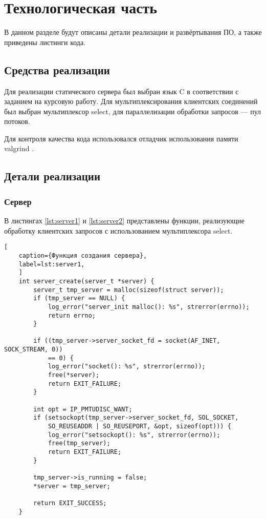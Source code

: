 \chapter{Технологическая часть}

В данном разделе будут описаны детали реализации и развёртывания ПО, а также приведены листинги кода.

\section{Средства реализации}

Для реализации статического сервера был выбран язык C в соответствии с заданием на курсовую работу. Для мультиплексирования клиентских соединений был выбран мультиплексор select, для параллелизации обработки запросов --- пул потоков.

Для контроля качества кода использовался отладчик использования памяти valgrind \cite{valgrind}.

\section{Детали реализации}

\subsection{Сервер}

В листингах \ref{lst:server1} и \ref{lst:server2} представлены функции, реализующие обработку клиентских запросов с использованием мультиплексора select.

\begin{lstlisting}[
	caption={Функция создания сервера},
	label=lst:server1,
	]
	int server_create(server_t *server) {
		server_t tmp_server = malloc(sizeof(struct server));
		if (tmp_server == NULL) {
			log_error("server_init malloc(): %s", strerror(errno));
			return errno;
		}
		
		if ((tmp_server->server_socket_fd = socket(AF_INET, SOCK_STREAM, 0)) 
			== 0) {
			log_error("socket(): %s", strerror(errno));
			free(*server);
			return EXIT_FAILURE;
		}
		
		int opt = IP_PMTUDISC_WANT;
		if (setsockopt(tmp_server->server_socket_fd, SOL_SOCKET, 
			SO_REUSEADDR | SO_REUSEPORT, &opt, sizeof(opt))) {
			log_error("setsockopt(): %s", strerror(errno));
			free(tmp_server);
			return EXIT_FAILURE;
		}
		
		tmp_server->is_running = false;
		*server = tmp_server;
		
		return EXIT_SUCCESS;
	}
\end{lstlisting}

